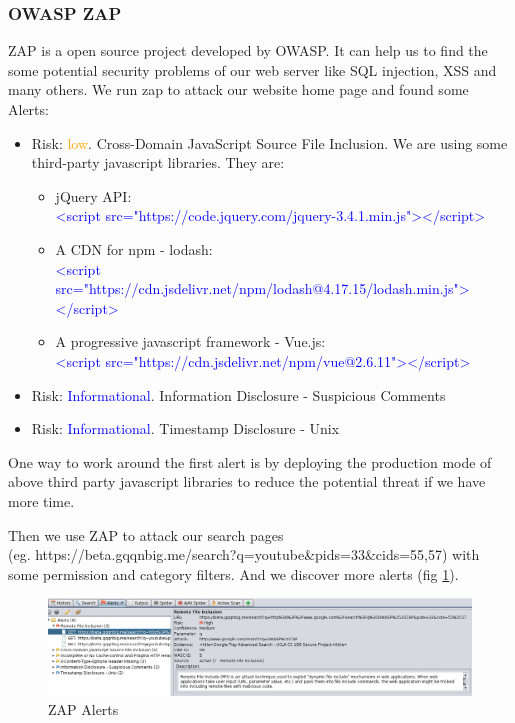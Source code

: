 \documentclass[12pt, a4paper]{article}
\newcommand{\code}[1]{\texttt{#1}}
\begin{document}
\subsubsection{OWASP ZAP}
ZAP is a open source project developed by OWASP. It can help us to find the some potential security problems of our web server like SQL injection, XSS and many others.
We run zap to attack our website home page and found some Alerts:
\begin{itemize}
    \item Risk: \textcolor{orange}{low}. Cross-Domain JavaScript Source File Inclusion. We are using some third-party javascript libraries. They are:
    \begin{itemize}
        \item jQuery API:\\ \textcolor{blue}{<script src="https://code.jquery.com/jquery-3.4.1.min.js"></script>}
        \item A CDN for npm - lodash:\\ \textcolor{blue}{<script src="https://cdn.jsdelivr.net/npm/lodash@4.17.15/lodash.min.js"></script>}
        \item A progressive javascript framework - Vue.js:\\ \textcolor{blue}{<script src="https://cdn.jsdelivr.net/npm/vue@2.6.11"></script>}
    \end{itemize}
    \item Risk: \textcolor{blue}{Informational}. Information Disclosure - Suspicious Comments
    \item Risk: \textcolor{blue}{Informational}. Timestamp Disclosure - Unix
\end{itemize}
One way to work around the first alert is by deploying the production mode of above third party javascript libraries to reduce the potential threat if we have more time.

Then we use ZAP to attack our search pages \\(eg. https://beta.gqqnbig.me/search?q=youtube&pids=33&cids=55,57) with some permission and category filters.
And we discover more alerts (fig \ref{fig:zap-alerts}).

\begin{figure}[H]
\centering
\includegraphics[width=\textwidth, frame]{zap_alerts.png}
\caption{ZAP Alerts}
\label{fig:zap-alerts}
\end{figure}
\end{document}
